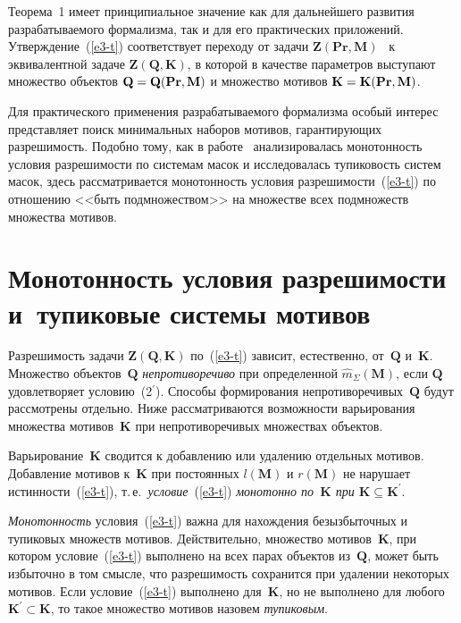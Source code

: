 \begin{multicols}{2}
Теорема~1 имеет принципиальное значение как для дальнейшего развития
разрабатываемого формализма, так и для его практических приложений.
Утверждение~(\ref{e3-t}) соответствует переходу от задачи
$\mathbf{Z}(\mathbf{Pr},\mathbf{M})$~\cite{3-t} к эквивалентной задаче
$\mathbf{Z}(\mathbf{Q}, \mathbf{K})$, в которой в качестве
параметров выступают множество объектов $\mathbf{Q}\hm = \mathbf{Q}(\mathbf{Pr}, \mathbf{M})$
и множество  мотивов $\mathbf{K} \hm= \mathbf{K}(\mathbf{Pr}, \mathbf{M})$.

Для практического применения разраба\-ты\-ва\-емо\-го формализма особый
интерес представляет поиск минимальных наборов мотивов, га\-ран\-ти\-ру\-ющих
разрешимость. Подобно тому, как в работе~\cite{3-t} анализировалась
монотонность условия разрешимости по системам масок и исследовалась
тупиковость систем масок, здесь рассматривается монотонность условия
разрешимости~(\ref{e3-t}) по отношению <<быть подмножеством>> на
множестве всех подмножеств множества мотивов.

\section{Монотонность условия разрешимости и~тупиковые
системы мотивов} %

Разрешимость задачи $\mathbf{Z}(\mathbf{Q}, \mathbf{K})$ по~(\ref{e3-t}) зависит, естественно, от~$\mathbf{Q}$
и~$\mathbf{K}$. Множество объектов~$\mathbf{Q}$ \textit{непротиворечиво} при
определенной $\hat{m}_\Sigma(\mathbf{M})$, если $\mathbf{Q}$ удовлетворяет
условию~(2$^\prime$). Способы формирования непротиворечивых~$\mathbf{Q}$
будут рассмотрены отдельно. Ниже рассматриваются возможности
варь\-и\-ро\-ва\-ния множества мотивов~$\mathbf{K}$ при непротиворечивых множествах
объектов.

Варьирование~$\mathbf{K}$ сводится к добавлению или удалению отдельных
мотивов. Добавление мотивов к~$\mathbf{K}$ при постоянных $l(\mathbf{M})$ и $r(\mathbf{M})$ не
нарушает истинности~(\ref{e3-t}), т.\,е.\ \textit{условие}~(\ref{e3-t})
\textit{монотонно по~$\mathbf{K}$ при $\mathbf{K} \subseteq \mathbf{K}^\prime$}.

\textit{Монотонность} условия~(\ref{e3-t}) важна для нахождения
безызбыточных и тупиковых множеств мотивов. Действительно, множество
мотивов~$\mathbf{K}$, при котором условие~(\ref{e3-t}) выполнено на всех парах
объектов из~$\mathbf{Q}$, может быть избыточно в том смысле, что разрешимость
сохранится при удалении некоторых мотивов. Если условие~(\ref{e3-t})
выполнено для~$\mathbf{K}$, но не выполнено для любого $\mathbf{K}^\prime \subset \mathbf{K}$, то
такое множество мотивов назовем \textit{тупиковым}.


\end{multicols}
